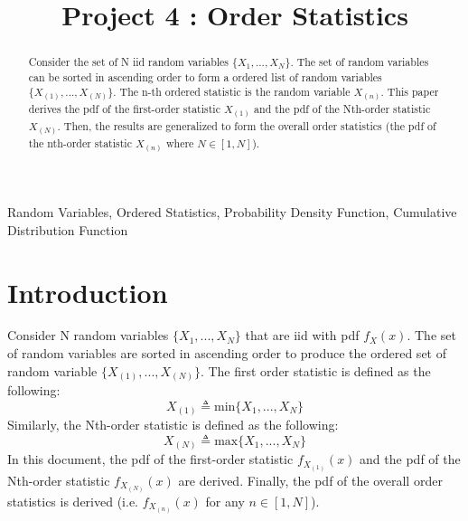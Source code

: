 \documentclass[conference]{IEEEtran}
\begin{document}
\title{Project 4 : Order Statistics}

\author{
}
\maketitle

\begin{abstract}
Consider the set of N iid random variables $\{X_1,...,X_N\}$. The set of random variables can be sorted in ascending order to form a ordered list of random variables $\{X_{(1)},...,X_{(N)}\}$. The n-th ordered statistic is the random variable $X_{(n)}$. This paper derives the pdf of the first-order statistic $X_{(1)}$ and the pdf of the Nth-order statistic $X_{(N)}$. Then, the results are generalized to form the overall order statistics (the pdf of the nth-order statistic $X_{(n)}$ where $N\in [1, N]$).
\end{abstract}

\begin{IEEEkeywords}
Random Variables, Ordered Statistics, Probability Density Function, Cumulative Distribution Function
\end{IEEEkeywords}

\section{Introduction}
Consider N random variables $\{X_1,...,X_N\}$ that are iid with pdf $f_X(x)$. The set of random variables are sorted in ascending order to produce the ordered set of random variable $\{X_{(1)},...,X_{(N)}\}$. The first order statistic is defined as the following:
\begin{equation}
X_{(1)}\triangleq\text{min}\{X_1,...,X_N\}
\end{equation}
Similarly, the Nth-order statistic is defined as the following:
\begin{equation}
X_{(N)}\triangleq\text{max}\{X_1,...,X_N\}
\end{equation}
In this document, the pdf of the first-order statistic $f_{X_{(1)}}(x)$ and the pdf of the Nth-order statistic $f_{X_{(N)}}(x)$ are derived. Finally, the pdf of the overall order statistics is derived (i.e. $f_{X_{(n)}}(x)$ for any $n\in[1,N]$).
\end{document}
